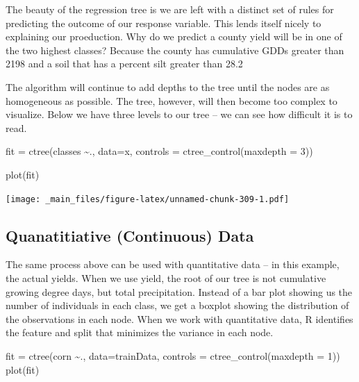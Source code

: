 \documentclass[
]{book}
\newenvironment{Shaded}{\begin{snugshade}}{\end{snugshade}}
\newcommand{\AttributeTok}[1]{\textcolor[rgb]{0.77,0.63,0.00}{#1}}
\newcommand{\DecValTok}[1]{\textcolor[rgb]{0.00,0.00,0.81}{#1}}
\newcommand{\FunctionTok}[1]{\textcolor[rgb]{0.00,0.00,0.00}{#1}}
\newcommand{\NormalTok}[1]{#1}
\newcommand{\OtherTok}[1]{\textcolor[rgb]{0.56,0.35,0.01}{#1}}
\newcommand{\SpecialCharTok}[1]{\textcolor[rgb]{0.00,0.00,0.00}{#1}}
\begin{document}
The beauty of the regression tree is we are left with a distinct set of rules for predicting the outcome of our response variable. This lends itself nicely to explaining our proeduction. Why do we predict a county yield will be in one of the two highest classes? Because the county has cumulative GDDs greater than 2198 and a soil that has a percent silt greater than 28.2

The algorithm will continue to add depths to the tree until the nodes are as homogeneous as possible. The tree, however, will then become too complex to visualize. Below we have three levels to our tree -- we can see how difficult it is to read.

\begin{Shaded}
\begin{Highlighting}[]
\NormalTok{fit }\OtherTok{=} \FunctionTok{ctree}\NormalTok{(classes }\SpecialCharTok{\textasciitilde{}}\NormalTok{., }\AttributeTok{data=}\NormalTok{x,}
            \AttributeTok{controls =} \FunctionTok{ctree\_control}\NormalTok{(}\AttributeTok{maxdepth =} \DecValTok{3}\NormalTok{))}

\FunctionTok{plot}\NormalTok{(fit)}
\end{Highlighting}
\end{Shaded}

\texttt{[image: \_main\_files/figure-latex/unnamed-chunk-309-1.pdf]}

\hypertarget{quanatitiative-continuous-data}{%
\subsection{Quanatitiative (Continuous) Data}\label{quanatitiative-continuous-data}}

The same process above can be used with quantitative data -- in this example, the actual yields. When we use yield, the root of our tree is not cumulative growing degree days, but total precipitation. Instead of a bar plot showing us the number of individuals in each class, we get a boxplot showing the distribution of the observations in each node. When we work with quantitative data, R identifies the feature and split that minimizes the variance in each node.

\begin{Shaded}
\begin{Highlighting}[]
\NormalTok{fit }\OtherTok{=} \FunctionTok{ctree}\NormalTok{(corn }\SpecialCharTok{\textasciitilde{}}\NormalTok{., }\AttributeTok{data=}\NormalTok{trainData,}
            \AttributeTok{controls =} \FunctionTok{ctree\_control}\NormalTok{(}\AttributeTok{maxdepth =} \DecValTok{1}\NormalTok{))}
\FunctionTok{plot}\NormalTok{(fit)}
\end{Highlighting}
\end{Shaded}
\end{document}
